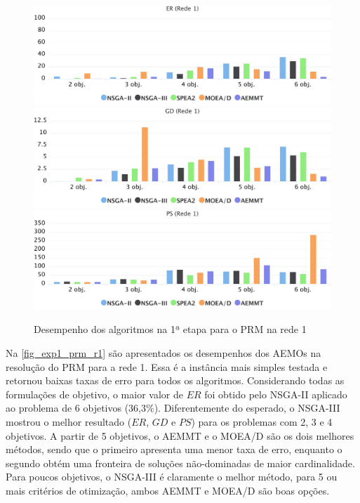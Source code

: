 \begin{figure}[!htbp]
	\includegraphics[width=1\textwidth]{cap_experimentos/figs/etapa1/er-mrp-r1}
	\includegraphics[width=1\textwidth]{cap_experimentos/figs/etapa1/gd-mrp-r1}
	\includegraphics[width=1\textwidth]{cap_experimentos/figs/etapa1/ps-mrp-r1}
	\caption{\label{fig_exp1_prm_r1}Desempenho dos algoritmos na 1ª etapa para o PRM na rede 1}
\end{figure}

Na \autoref{fig_exp1_prm_r1} são apresentados os desempenhos dos AEMOs na resolução do PRM para a rede 1. Essa é a instância mais simples testada e retornou baixas taxas de erro para todos os algoritmos. Considerando todas as formulações de objetivo, o maior valor de $ER$ foi obtido pelo NSGA-II aplicado ao problema de 6 objetivos (36,3\%). Diferentemente do esperado, o NSGA-III mostrou o melhor resultado ($ER$, $GD$ e $PS$) para os problemas com 2, 3 e 4 objetivos. A partir de 5 objetivos, o AEMMT e o MOEA/D são os dois melhores métodos, sendo que o primeiro apresenta uma menor taxa de erro, enquanto o segundo obtém uma fronteira de soluções não-dominadas de maior cardinalidade. Para poucos objetivos, o NSGA-III é claramente o melhor método, para 5 ou mais critérios de otimização, ambos AEMMT e MOEA/D são boas opções.

